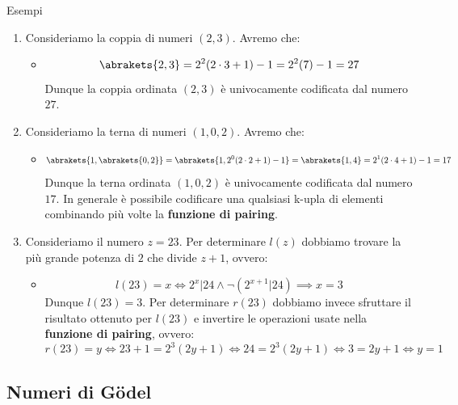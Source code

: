 \begin{generalbox}[colframe=azure-gradient-3!90!black]{Esempi}
  \begin{enumerate}
    \item Consideriamo la coppia di numeri \((2,3)\). Avremo che:
    \begin{itemize}
      \item [] \begin{equation}
        \abrakets{ 2,3 } =2^2(2\cdot 3+1)-1=2^2(7)-1=27
      \end{equation}
      Dunque la coppia ordinata \((2,3)\) è univocamente codificata dal numero \(27\).
    \end{itemize}
    \item Consideriamo la terna di numeri \((1,0,2)\). Avremo che:
    \begin{itemize}
      \item [] \begin{equation}
        \abrakets{ 1, \abrakets{ 0,2 } } = \abrakets{ 1,2^0(2\cdot 2+1)-1 } = \abrakets{ 1,4 } = 2^1(2\cdot 4+1)-1=17
      \end{equation}
      Dunque la terna ordinata \((1,0,2)\) è univocamente codificata dal numero \(17\). In generale è possibile codificare una qualsiasi k-upla di elementi combinando più volte la \textbf{funzione di pairing}.
    \end{itemize}
    \item Consideriamo il numero \(z=23\). Per determinare \(l(z)\) dobbiamo trovare la più grande potenza di \(2\) che divide \(z+1\), ovvero:
    \begin{itemize}
      \item [] \begin{equation}
        l(23)=x \iff 2^x \vert 24 \land \neg(2^{x+1}\vert 24) \implies x=3
      \end{equation}
      Dunque \(l(23)=3\). Per determinare \(r(23)\) dobbiamo invece sfruttare il risultato ottenuto per \(l(23)\) e invertire le operazioni usate nella \textbf{funzione di pairing}, ovvero:
      \begin{equation}
          r(23) = y \iff 23+1=2^3(2y+1) \iff 24=2^3(2y+1) \iff 3=2y+1 \iff y=1
      \end{equation}
    \end{itemize}
  \end{enumerate}
\end{generalbox}


\subsection{Numeri di Gödel}

